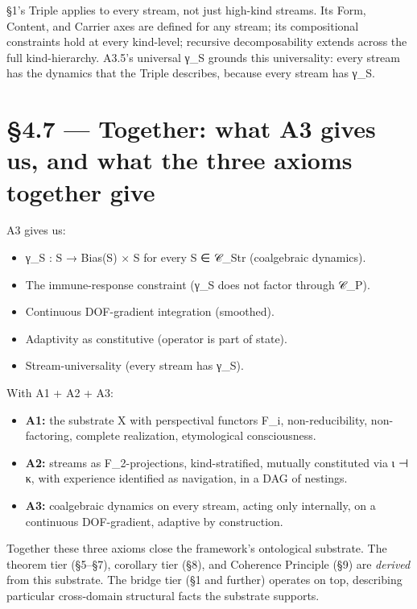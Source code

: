 \documentclass[11pt, openany]{book}
\newcommand{\sectionbreak}{\clearpage}
\begin{document}
§1's Triple applies to every stream, not just high-kind streams. Its Form, Content, and Carrier axes are defined for any stream; its compositional constraints hold at every kind-level; recursive decomposability extends across the full kind-hierarchy. A3.5's universal γ\_\allowbreak{}S grounds this universality: every stream has the dynamics that the Triple describes, because every stream has γ\_\allowbreak{}S.

\sectionbreak

\section{§4.7 --- Together: what A3 gives us, and what the three axioms together give}

A3 gives us:
\begin{itemize}
\item γ\_\allowbreak{}S : S → Bias(S) × S for every S ∈ 𝒞\_\allowbreak{}Str (coalgebraic dynamics).
\item The immune-response constraint (γ\_\allowbreak{}S does not factor through 𝒞\_\allowbreak{}P).
\item Continuous DOF-gradient integration (smoothed).
\item Adaptivity as constitutive (operator is part of state).
\item Stream-universality (every stream has γ\_\allowbreak{}S).
\end{itemize}

With A1 + A2 + A3:
\begin{itemize}
\item \textbf{A1:} the substrate X with perspectival functors F\_\allowbreak{}i, non-reducibility, non-factoring, complete realization, etymological consciousness.
\item \textbf{A2:} streams as F\_\allowbreak{}2-projections, kind-stratified, mutually constituted via ι ⊣ κ, with experience identified as navigation, in a DAG of nestings.
\item \textbf{A3:} coalgebraic dynamics on every stream, acting only internally, on a continuous DOF-gradient, adaptive by construction.
\end{itemize}

Together these three axioms close the framework's ontological substrate. The theorem tier (§5–§7), corollary tier (§8), and Coherence Principle (§9) are \textit{derived} from this substrate. The bridge tier (§1 and further) operates on top, describing particular cross-domain structural facts the substrate supports.
\end{document}
